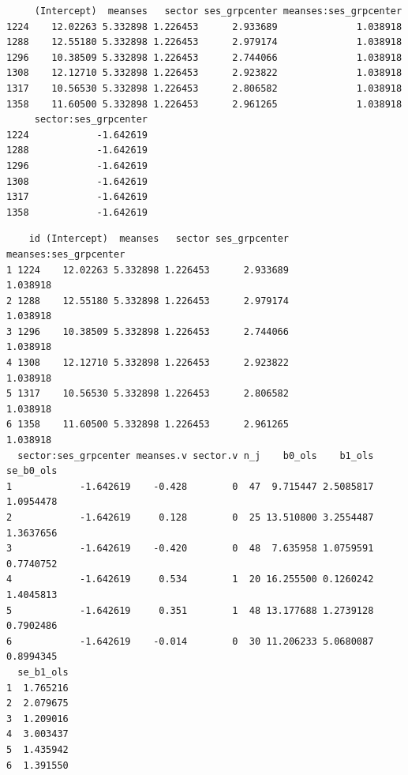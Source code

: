 \documentclass[
  letterpaper,
  DIV=11,
  numbers=noendperiod]{scrreprt}
\newenvironment{Shaded}{}{}
\newcommand{\AttributeTok}[1]{\textcolor[rgb]{0.49,0.56,0.16}{#1}}
\newcommand{\CommentTok}[1]{\textcolor[rgb]{0.38,0.63,0.69}{\textit{#1}}}
\newcommand{\FloatTok}[1]{\textcolor[rgb]{0.25,0.63,0.44}{#1}}
\newcommand{\FunctionTok}[1]{\textcolor[rgb]{0.02,0.16,0.49}{#1}}
\newcommand{\NormalTok}[1]{#1}
\newcommand{\OtherTok}[1]{\textcolor[rgb]{0.00,0.44,0.13}{#1}}
\newcommand{\SpecialCharTok}[1]{\textcolor[rgb]{0.25,0.44,0.63}{#1}}
\newcommand{\StringTok}[1]{\textcolor[rgb]{0.25,0.44,0.63}{#1}}
\begin{document}
\begin{verbatim}
     (Intercept)  meanses   sector ses_grpcenter meanses:ses_grpcenter
1224    12.02263 5.332898 1.226453      2.933689              1.038918
1288    12.55180 5.332898 1.226453      2.979174              1.038918
1296    10.38509 5.332898 1.226453      2.744066              1.038918
1308    12.12710 5.332898 1.226453      2.923822              1.038918
1317    10.56530 5.332898 1.226453      2.806582              1.038918
1358    11.60500 5.332898 1.226453      2.961265              1.038918
     sector:ses_grpcenter
1224            -1.642619
1288            -1.642619
1296            -1.642619
1308            -1.642619
1317            -1.642619
1358            -1.642619
\end{verbatim}

\begin{Shaded}
\end{Shaded}

\begin{verbatim}
    id (Intercept)  meanses   sector ses_grpcenter meanses:ses_grpcenter
1 1224    12.02263 5.332898 1.226453      2.933689              1.038918
2 1288    12.55180 5.332898 1.226453      2.979174              1.038918
3 1296    10.38509 5.332898 1.226453      2.744066              1.038918
4 1308    12.12710 5.332898 1.226453      2.923822              1.038918
5 1317    10.56530 5.332898 1.226453      2.806582              1.038918
6 1358    11.60500 5.332898 1.226453      2.961265              1.038918
  sector:ses_grpcenter meanses.v sector.v n_j    b0_ols    b1_ols se_b0_ols
1            -1.642619    -0.428        0  47  9.715447 2.5085817 1.0954478
2            -1.642619     0.128        0  25 13.510800 3.2554487 1.3637656
3            -1.642619    -0.420        0  48  7.635958 1.0759591 0.7740752
4            -1.642619     0.534        1  20 16.255500 0.1260242 1.4045813
5            -1.642619     0.351        1  48 13.177688 1.2739128 0.7902486
6            -1.642619    -0.014        0  30 11.206233 5.0680087 0.8994345
  se_b1_ols
1  1.765216
2  2.079675
3  1.209016
4  3.003437
5  1.435942
6  1.391550
\end{verbatim}
\end{document}
